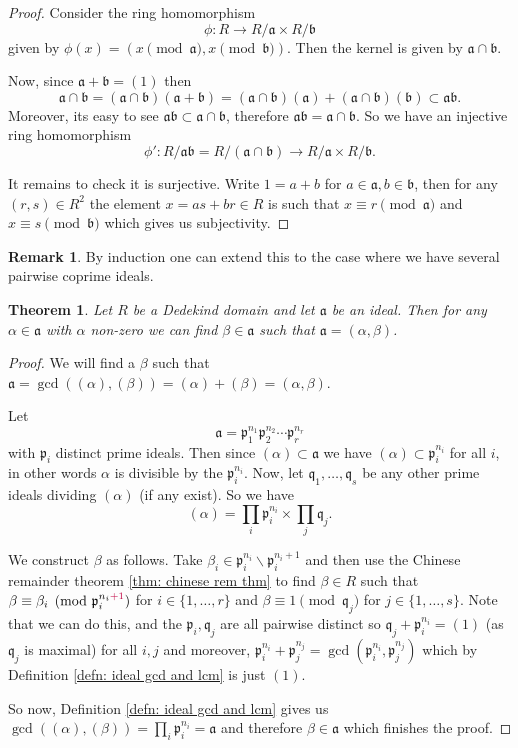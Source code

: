 \documentclass[11pt,a4paper]{report}
\theoremstyle{plain}
\newtheorem{thm}[subsection]{Theorem}
\theoremstyle{definition}
\theoremstyle{definition}
\newtheorem{rmrk}[subsection]{Remark}
\def\gothb{\mathfrak{b}}
\def\gothp{\mathfrak{p}}
\def\gothq{\mathfrak{q}}
\def \a{\alpha}
\def\gotha{\mathfrak{a}}
\def \lra{\longrightarrow}
\begin{document}
	\begin{proof}
		Consider the ring homomorphism \[\phi: R \to R/\gotha \times R/\gothb\] given by $\phi(x)=(x \pmod \gotha, x \pmod \gothb)$. Then the kernel is given by $\gotha \cap \gothb$.
		
		Now, since $\gotha+\gothb=(1)$ then \[\gotha \cap \gothb =(\gotha \cap \gothb)(\gotha+\gothb)=(\gotha \cap \gothb)(\gotha)+(\gotha \cap \gothb)(\gothb) \subset \gotha \gothb.\] Moreover, its easy to see $\gotha\gothb \subset \gotha \cap \gothb$, therefore $\gotha\gothb=\gotha \cap \gothb$. So we have an injective ring homomorphism \[\phi':R/ \gotha\gothb=R/(\gotha\cap \gothb) \lra R/\gotha \times R/\gothb.\]
		
		It remains to check it is surjective. Write $1=a+b$ for $a \in \gotha,b \in \gothb$, then for any $(r,s) \in R^2$ the element $x=as+br \in R$ is such that $x \equiv r \pmod \gotha$ and $x \equiv s \pmod \gothb$ which gives us subjectivity.
	\end{proof}
	
	\begin{rmrk}
		By induction one can extend this to the case where we have several pairwise coprime ideals.
	\end{rmrk}
	
	\begin{thm}
		Let $R$ be a Dedekind domain and let $\gotha$ be an ideal. Then for any $\a \in \gotha$ with $\a$ non-zero we can find $\beta \in \gotha$ such that $\gotha=(\a,\beta)$.
	\end{thm}
	
	
	\begin{proof}
		We will find a $\beta$ such that $\gotha=\gcd((\a),(\beta))=(\a)+(\beta)=(\a,\beta)$.
		
		Let \[\gotha=\gothp_1^{n_1}\gothp_2^{n_2}\cdots\gothp_r^{n_r}\] with $\gothp_i$ distinct prime ideals. Then since $(\a) \subset \gotha$ we have $(\a) \subset \gothp_i^{n_i}$ for all $i$, in other words $\a$ is divisible by the $\gothp_i^{n_i}$. Now, let $\gothq_1,\dots,\gothq_s$ be any other prime ideals dividing $(\a)$ (if any exist). So we have \[(\a)=\prod_i \gothp_i^{n_i} \times \prod_j \gothq_j.\]
		
		We construct $\beta$ as follows. Take $\beta_i \in \gothp_i^{n_i} \backslash \gothp_i^{n_i+1}$ and then use the Chinese remainder theorem \ref{thm: chinese rem thm} to find $\beta \in R$ such that $\beta \equiv \beta_i \pmod {\gothp_i^{n_i\textcolor{purple}{+1}}}$ for $i \in \{1,\dots,r\}$ and $\beta \equiv 1 \pmod {\gothq_j}$ for $j \in \{1,\dots,s\}$. Note that we can do this, and the $\gothp_i,\gothq_j$ are all pairwise distinct so $\gothq_j+\gothp_i^{n_i}=(1)$ (as $\gothq_j$ is maximal) for all $i,j$ and moreover, $\gothp_i^{n_i}+\gothp_j^{n_j}=\gcd(\gothp_i^{n_i},\gothp_j^{n_j})$ which by Definition \ref{defn: ideal gcd and lcm} is just $(1)$.
		
		So now,  Definition \ref{defn: ideal gcd and lcm} gives us $\gcd((\a),(\beta))=\prod_i \gothp_i^{n_i}=\gotha$ and therefore $\beta \in \gotha$ which finishes the proof.
		
		
	\end{proof}
	
\end{document}
